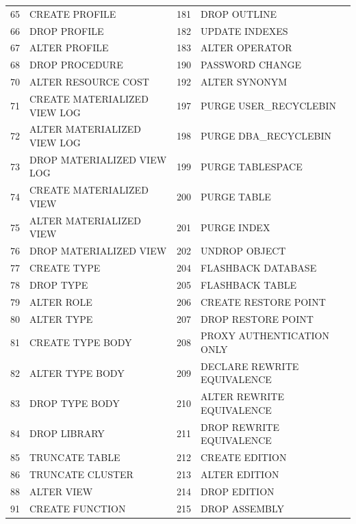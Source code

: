 \begin{appendix}
\begin{longtable}[]{@{}rl|rl@{}}
65   & CREATE PROFILE               & 181 & DROP OUTLINE                 \\
66   & DROP PROFILE                 & 182 & UPDATE INDEXES               \\
67   & ALTER PROFILE                & 183 & ALTER OPERATOR               \\
68   & DROP PROCEDURE               & 190 & PASSWORD CHANGE              \\
70   & ALTER RESOURCE COST          & 192 & ALTER SYNONYM                \\
71   & CREATE MATERIALIZED VIEW LOG & 197 & PURGE USER\_RECYCLEBIN       \\
72   & ALTER MATERIALIZED VIEW LOG  & 198 & PURGE DBA\_RECYCLEBIN        \\
73   & DROP MATERIALIZED VIEW LOG   & 199 & PURGE TABLESPACE             \\
74   & CREATE MATERIALIZED VIEW     & 200 & PURGE TABLE                  \\
75   & ALTER MATERIALIZED VIEW      & 201 & PURGE INDEX                  \\
76   & DROP MATERIALIZED VIEW       & 202 & UNDROP OBJECT                \\
77   & CREATE TYPE                  & 204 & FLASHBACK DATABASE           \\
78   & DROP TYPE                    & 205 & FLASHBACK TABLE              \\
79   & ALTER ROLE                   & 206 & CREATE RESTORE POINT         \\
80   & ALTER TYPE                   & 207 & DROP RESTORE POINT           \\
81   & CREATE TYPE BODY             & 208 & PROXY AUTHENTICATION ONLY    \\
82   & ALTER TYPE BODY              & 209 & DECLARE REWRITE EQUIVALENCE  \\
83   & DROP TYPE BODY               & 210 & ALTER REWRITE EQUIVALENCE    \\
84   & DROP LIBRARY                 & 211 & DROP REWRITE EQUIVALENCE     \\
85   & TRUNCATE TABLE               & 212 & CREATE EDITION               \\
86   & TRUNCATE CLUSTER             & 213 & ALTER EDITION                \\
88   & ALTER VIEW                   & 214 & DROP EDITION                 \\
91   & CREATE FUNCTION              & 215 & DROP ASSEMBLY                \\

\end{longtable}
\end{appendix}
